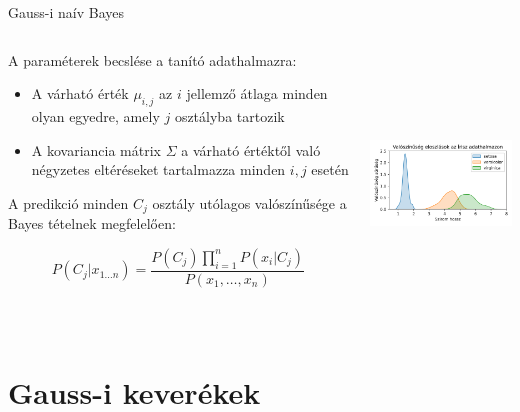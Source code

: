 \documentclass[english, aspectratio=169]{beamer}
\makeatletter
\let\origtableofcontents=\tableofcontents
\def\tableofcontents{\@ifnextchar[{\origtableofcontents}{\gobbletableofcontents}}
\def\gobbletableofcontents#1{\origtableofcontents}
\makeatother
\begin{document}
\begin{frame}{Gauss-i naív Bayes}
\begin{columns}
\begin{column}{.5\textwidth}
A paraméterek becslése a tanító adathalmazra:
\begin{itemize}
	\item A várható érték $\mu_{i,j}$ az $i$ jellemző átlaga minden olyan egyedre, amely $j$ osztályba tartozik
	\item A kovariancia mátrix $\Sigma$ a várható értéktől való négyzetes eltéréseket tartalmazza minden $i,j$ esetén
\end{itemize}
A predikció minden $C_j$ osztály utólagos valószínűsége a Bayes tételnek megfelelően: 
\begin{block}{}
\vspace{-.4cm}
\[
P\left( C_j \vert x_{1 \ldots n} \right) = \frac{P(C_j) \prod_{i=1}^{n} P(x_i | C_j)}{P(x_1, \ldots, x_n)}
\]
\end{block}
\end{column}
\begin{column}{.5\textwidth}
\begin{center}
\includegraphics[width=7cm, height=7cm, keepaspectratio]{images/generative_11.png}
\end{center}
\end{column}
\end{columns}
\end{frame}

\section{Gauss-i keverékek}

\begin{frame}
\tableofcontents[currentsection]
\end{frame}
\end{document}
